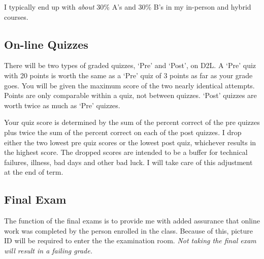 \documentclass[letterpaper,10pt]{article}
\newif\ifonline
\begin{document}
  I typically end up with \emph{about} 30\%
  A's and 30\% B's in my in-person and hybrid courses.    
\fi

\subsection{On-line Quizzes}

There will be two types of graded quizzes, `Pre' and `Post', on D2L.  A `Pre'
quiz with 20 points is worth the same as a `Pre' quiz of 3 points as
far as your grade goes.  You will be given the maximum score of the two nearly identical attempts. Points are only comparable within a quiz, not between quizzes.  `Post' quizzes are worth twice as much as `Pre' quizzes.

\ifonline

  The optimal study pattern is to:
  \begin{itemize}
  \item Read the required material.
  \item Try some of the practice quiz questions.
  \item Wait a day.
  \item Review the material again and do more of the practice questions.
  \item If confident, take the `Pre' quiz, reviewing concepts between each of the two attempts. Ideally you should put a day for review of the questions between the two attempts.
  \item Wait a day.
  \item Review and take the `Post' quiz.
  \end{itemize}

\fi


Your quiz score is determined by the sum of the percent correct of the pre quizzes plus twice the sum of the percent correct on each of the post quizzes. I drop either the two lowest pre quiz scores or the lowest post quiz, whichever results in the highest score. The dropped scores are intended to be a buffer for technical
failures, illness, bad days and other bad luck.  I will take care of this adjustment at the end of term.  

\subsection{Final Exam}

The function of the final exams is to provide me with added assurance that online work was completed by the person enrolled in the class.  Because of this, picture ID will be required to enter the the examination room.  \emph{Not taking the final exam will result in a failing grade.}
\end{document}

